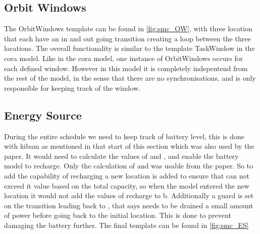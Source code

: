 \subsection{Orbit Windows}
The OrbitWindows template can be found in \cref{fig:smc_OW}, with three location that each have an in and out going transition creating a loop between the three locations. The overall functionality is similar to the template TaskWindow in the \gls{cora} model. Like in the \gls{cora} model, one instance of OrbitWindows occurs for each defined window. However in this model it is completely indepentend from the rest of the model, in the sense that there are no synchronisations, and is only responsible for keeping track of the window.

\subsection{Energy Source}
During the entire schedule we need to keep track of battery level, this is done with \gls{kibam} as mentioned in that start of this section which was also used by the paper. It would need to calculate the values of  and , and enable the battery model to recharge. Only the calculation of  and  was usable from the paper. So to add the capability of recharging a new location is added to ensure that  can not exceed it value based on the total capacity, so when the model entered the new location it would not add the values of recharge to b. Additionally a guard is set on the transition leading back to , that says  needs to be drained a small amount of power before going back to the initial location. This is done to prevent damaging the battery further. The final template can be found in \cref{fig:smc_ES}

